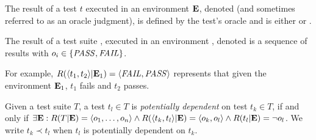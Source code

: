 \begin{definition}
The result of a test $t$ executed in an environment\/ $\mathbf{E}$,
denoted\/  (and sometimes referred to 
as an oracle judgment), is defined by the test's oracle
and is either \pass or \fail.

The result of a test suite\/ , executed in an
environment\/ \env, denoted\/  is a
sequence of results\/  with $o_i \in \{\mathit{PASS},\mathit{FAIL}\}$.


For example, $R( \langle t_1, t_2 \rangle |\mathbf{E}_1) =  \langle \mathit{FAIL}, \mathit{PASS} \rangle $ represents that 
given the environment\/ $\mathbf{E}_1$, $t_1$ fails and\/ $t_2$ passes.
\end{definition}


%



\begin{definition} \label{def:dependency}
Given a test suite\/ $T$,
a test\/ $t_l \in T$ is \emph{potentially dependent} on test\/ $t_k
\in T$, if and only if\/
$\exists \mathbf{E} : R(T|\mathbf{E}) =  \langle o_1,\dots, o_n \rangle  \wedge
R( \langle t_k,t_l \rangle |\mathbf{E}) =  \langle o_k, o_l \rangle  \wedge
R(t_l|\mathbf{E}) = \neg o_l$.
We write\/ $t_k \prec t_l$ when\/ $t_l$ is potentially dependent on\/ $t_k$.
\end{definition}


